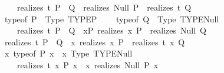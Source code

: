 \begin{isabellebody}
\ \ \ \ \ {\isacharparenleft}{\kern0pt}realizes\ t\ {\isacharparenleft}{\kern0pt}P\ {\isasymlongrightarrow}\ Q{\isacharparenright}{\kern0pt}{\isacharparenright}{\kern0pt}\ {\isasymequiv}\ {\isacharparenleft}{\kern0pt}realizes\ Null\ P\ {\isasymlongrightarrow}\ realizes\ t\ Q{\isacharparenright}{\kern0pt}{\isachardoublequoteclose}\isanewline
\isanewline
\ \ {\isachardoublequoteopen}{\isacharparenleft}{\kern0pt}typeof\ P{\isacharparenright}{\kern0pt}\ {\isasymequiv}\ {\isacharparenleft}{\kern0pt}Type\ {\isacharparenleft}{\kern0pt}TYPE{\isacharparenleft}{\kern0pt}{\isacharprime}{\kern0pt}P{\isacharparenright}{\kern0pt}{\isacharparenright}{\kern0pt}{\isacharparenright}{\kern0pt}\ {\isasymLongrightarrow}\isanewline
\ \ \ {\isacharparenleft}{\kern0pt}typeof\ Q{\isacharparenright}{\kern0pt}\ {\isasymequiv}\ {\isacharparenleft}{\kern0pt}Type\ {\isacharparenleft}{\kern0pt}TYPE{\isacharparenleft}{\kern0pt}Null{\isacharparenright}{\kern0pt}{\isacharparenright}{\kern0pt}{\isacharparenright}{\kern0pt}\ {\isasymLongrightarrow}\isanewline
\ \ \ \ \ {\isacharparenleft}{\kern0pt}realizes\ t\ {\isacharparenleft}{\kern0pt}P\ {\isasymlongrightarrow}\ Q{\isacharparenright}{\kern0pt}{\isacharparenright}{\kern0pt}\ {\isasymequiv}\ {\isacharparenleft}{\kern0pt}{\isasymforall}x{\isacharcolon}{\kern0pt}{\isacharcolon}{\kern0pt}{\isacharprime}{\kern0pt}P{\isachardot}{\kern0pt}\ realizes\ x\ P\ {\isasymlongrightarrow}\ realizes\ Null\ Q{\isacharparenright}{\kern0pt}{\isachardoublequoteclose}\isanewline
\isanewline
\ \ {\isachardoublequoteopen}{\isacharparenleft}{\kern0pt}realizes\ t\ {\isacharparenleft}{\kern0pt}P\ {\isasymlongrightarrow}\ Q{\isacharparenright}{\kern0pt}{\isacharparenright}{\kern0pt}\ {\isasymequiv}\ {\isacharparenleft}{\kern0pt}{\isasymforall}x{\isachardot}{\kern0pt}\ realizes\ x\ P\ {\isasymlongrightarrow}\ realizes\ {\isacharparenleft}{\kern0pt}t\ x{\isacharparenright}{\kern0pt}\ Q{\isacharparenright}{\kern0pt}{\isachardoublequoteclose}\isanewline
\isanewline
\ \ {\isachardoublequoteopen}{\isacharparenleft}{\kern0pt}{\isasymlambda}x{\isachardot}{\kern0pt}\ typeof\ {\isacharparenleft}{\kern0pt}P\ x{\isacharparenright}{\kern0pt}{\isacharparenright}{\kern0pt}\ {\isasymequiv}\ {\isacharparenleft}{\kern0pt}{\isasymlambda}x{\isachardot}{\kern0pt}\ Type\ {\isacharparenleft}{\kern0pt}TYPE{\isacharparenleft}{\kern0pt}Null{\isacharparenright}{\kern0pt}{\isacharparenright}{\kern0pt}{\isacharparenright}{\kern0pt}\ {\isasymLongrightarrow}\isanewline
\ \ \ \ \ {\isacharparenleft}{\kern0pt}realizes\ t\ {\isacharparenleft}{\kern0pt}{\isasymforall}x{\isachardot}{\kern0pt}\ P\ x{\isacharparenright}{\kern0pt}{\isacharparenright}{\kern0pt}\ {\isasymequiv}\ {\isacharparenleft}{\kern0pt}{\isasymforall}x{\isachardot}{\kern0pt}\ realizes\ Null\ {\isacharparenleft}{\kern0pt}P\ x{\isacharparenright}{\kern0pt}{\isacharparenright}{\kern0pt}{\isachardoublequoteclose}\isanewline

\end{isabellebody}
